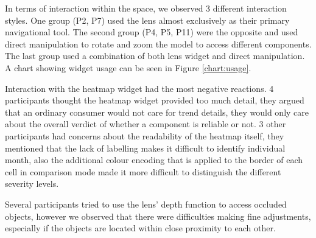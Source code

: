    
In terms of interaction within the \threed space, we observed 3 different
interaction styles. One group (P2, P7) used the lens almost exclusively
as their primary navigational tool. The second group (P4, P5, P11) were the
opposite and used direct manipulation to rotate and zoom the \threed model to
access different components. The last group used a combination of both lens
widget and direct manipulation. A chart showing widget usage can be seen in
Figure \ref{chart:usage}.


Interaction with the heatmap widget had the most negative reactions. 4
participants thought the heatmap widget provided too much detail, they argued
that an ordinary consumer would not care for trend details, they would only care
about the overall verdict of whether a component is reliable or not. 3 other
participants had concerns about the readability of the heatmap itself, they
mentioned that the lack of labelling makes it difficult to identify individual
month, also the additional colour encoding that is applied to the border of each
cell in comparison mode made it more difficult to distinguish the different
severity levels.


Several participants tried to use the lens' depth function to access occluded
objects, however we observed that there were difficulties making fine
adjustments, especially if the objects are located within close proximity to
each other.
  
  
  